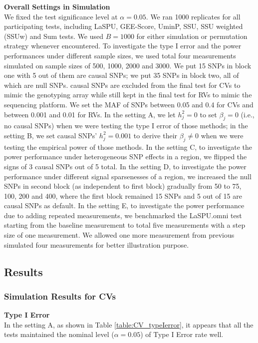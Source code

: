 \documentclass[12pt]{article}
\begin{document}
\textbf{Overall Settings in Simulation}\\
We fixed the test significance level at $\alpha = 0.05$. We ran 1000 replicates for all participating tests, including LaSPU, GEE-Score, UminP, SSU, SSU weighted (SSUw) and Sum tests. We used $B = 1000$ for either simulation or permutation strategy whenever encountered. To investigate the type I error and the power performances under different sample sizes, we used total four measurements simulated on sample sizes of 500, 1000, 2000 and 3000. We put 15 SNPs in block one with 5 out of them are causal SNPs; we put 35 SNPs in block two, all of which are null SNPs. causal SNPs are excluded from the final test for CVs to mimic the genotyping array while still kept in the final test for RVs to mimic the sequencing platform. We set the MAF of SNPs between 0.05 and 0.4 for CVs and between 0.001 and 0.01 for RVs. In the setting A, we let $h_j^2 = 0$ to set $\beta_j = 0$ (i.e., no causal SNPs) when we were testing the type I error of those methods; in the setting B, we set causal SNPs' $h_j^2 = 0.001$ to derive their $\beta_j \neq 0$ when we were testing the empirical power of those methods. In the setting C, to investigate the power performance under heterogeneous SNP effects in a region, we flipped the signs of 3 causal SNPs out of 5 total. In the setting D, to investigate the power performance under different signal sparsenesses of a region, we increased the null SNPs in second block (as independent to first block) gradually from 50 to 75, 100, 200 and 400, where the first block remained 15 SNPs and 5 out of 15 are causal SNPs as default. In the setting E, to investigate the power performance due to adding repeated measurements, we benchmarked the LaSPU.omni test starting from the baseline measurement to total five measurements with a step size of one measurement. We allowed one more measurement from previous simulated four measurements for better illustration purpose.
\subsection{Results}
\subsubsection{Simulation Results for CVs}
\textbf{Type I Error}\\
In the setting A, as shown in Table \ref{table:CV_typeIerror}, it appears that all the tests maintained the nominal level ($\alpha = 0.05$) of Type I Error rate well.
\end{document}
